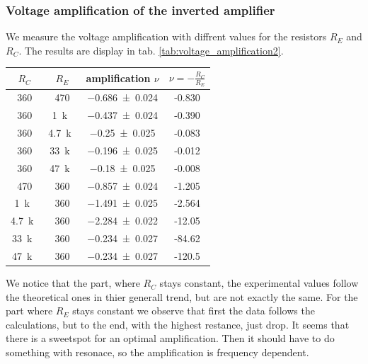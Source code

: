 \documentclass[a4paper,10pt]{article}
\numberwithin{equation}{section}
\begin{document}
\begin{multicols}{2}
	\subsubsection{Voltage amplification of the inverted amplifier}
	We measure the voltage amplification with diffrent values for the resistors $R_E$ and $R_C$. The results are display in tab. \ref{tab:voltage_amplification2}.
	\begin{center}
		\begin{tabular}{|c|c|c|c|}
			\hline
			$R_C$             & $R_E$             & amplification $\nu$ & $\nu = -\frac{R_C}{R_E}$ \\
			\hline
			\SI{360}{\Omega}  & \SI{470}{\Omega}  & \SI{-0.686+-0.024}{} & -0.830                   \\
			\SI{360}{\Omega}  & \SI{1}{k\Omega}   & \SI{-0.437+-0.024}{} & -0.390                   \\
			\SI{360}{\Omega}  & \SI{4.7}{k\Omega} & \SI{-0.25+-0.025}{}  & -0.083                   \\
			\SI{360}{\Omega}  & \SI{33}{k\Omega}  & \SI{-0.196+-0.025}{} & -0.012                   \\
			\SI{360}{\Omega}  & \SI{47}{k\Omega}  & \SI{-0.18+-0.025}{}  & -0.008                   \\
			\hline
			\SI{470}{\Omega}  & \SI{360}{\Omega}  & \SI{-0.857+-0.024}{} & -1.205                   \\
			\SI{1}{k\Omega}   & \SI{360}{\Omega}  & \SI{-1.491+-0.025}{} & -2.564                   \\
			\SI{4.7}{k\Omega} & \SI{360}{\Omega}  & \SI{-2.284+-0.022}{} & -12.05                   \\
			\SI{33}{k\Omega}  & \SI{360}{\Omega}  & \SI{-0.234+-0.027}{} & -84.62                   \\
			\SI{47}{k\Omega}  & \SI{360}{\Omega}  & \SI{-0.234+-0.027}{} & -120.5                   \\
			\hline
		\end{tabular}
		\label{tab:voltage_amplification2}
	\end{center}
  We notice that the part, where $R_C$ stays constant, the experimental values follow the theoretical ones in thier generall trend, but are not exactly the same. For the part where $R_E$ stays constant we observe that first the data follows the calculations, but to the end, with the highest restance, just drop. It seems that there is a sweetspot for an optimal amplification. Then it should have to do something with resonace, so the amplification is frequency dependent.


\end{multicols}
\end{document}
